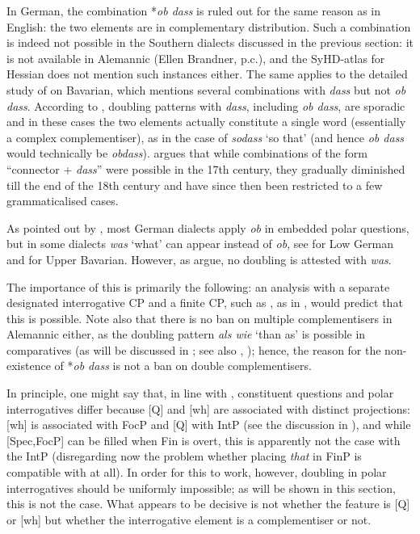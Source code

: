 In German, the combination *\textit{ob dass} is ruled out for the same reason as in English: the two elements are in complementary distribution. Such a combination is indeed not possible in the Southern dialects discussed in the previous section: it is not available in Alemannic (Ellen Brandner, p.c.), and the SyHD-atlas for Hessian does not mention such instances either. The same applies to the detailed study of \citet{bayer1984} on Bavarian, which mentions several combinations with \textit{dass} but not \textit{ob dass}. According to \citet[226]{meinunger2011}, doubling patterns with \textit{dass}, including \textit{ob dass}, are sporadic and in these cases the two elements actually constitute a single word (essentially a complex complementiser), as in the case of \textit{sodass} `so that' (and hence \textit{ob dass} would technically be \textit{obdass}). \citet{gillmanndgfs} argues that while combinations of the form ``connector + \textit{dass}'' were possible in the 17th century, they gradually diminished till the end of the 18th century and have since then been restricted to a few grammaticalised cases.

As pointed out by \citet[778--779]{weiss2013}, most German dialects apply \textit{ob} in embedded polar questions, but in some dialects \textit{was} `what' can appear instead of \textit{ob}, see \citet{zimmermann2011} for Low German and \citet{luehr1989} for Upper Bavarian. However, as \citet[24]{schallertdroegepheiff2018} argue, no doubling is attested with \textit{was}.

The importance of this is primarily the following: an analysis with a separate designated interrogative CP and a finite CP, such as , as in \citet{baltin2010}, would predict that this is possible. Note also that there is no ban on multiple complementisers in Alemannic either, as the doubling pattern \textit{als wie} `than as' is possible in comparatives (as will be discussed in ; see also \citealt{jaeger2010, jaeger2018}, \citealt{bacskaiatkari2014diss}); hence, the reason for the non-existence of *\textit{ob dass} is not a ban on double complementisers.

In principle, one might say that, in line with \citet{rizzi1997, rizzi2004}, constituent questions and polar interrogatives differ because [Q] and [wh] are associated with distinct projections: [wh] is associated with FocP and [Q] with IntP (see the discussion in ), and while [Spec,FocP] can be filled when Fin is overt, this is apparently not the case with the IntP (disregarding now the problem whether placing \textit{that} in FinP is compatible with \citealt{rizzi1997} at all). In order for this to work, however, doubling in polar interrogatives should be uniformly impossible; as will be shown in this section, this is not the case. What appears to be decisive is not whether the feature is [Q] or [wh] but whether the interrogative element is a complementiser or not.


